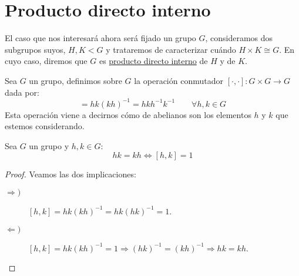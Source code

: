 \section{Producto directo interno}
El caso que nos interesará ahora será fijado un grupo $G$, consideramos dos subgrupos suyos, $H,K<G$ y trataremos de caracterizar cuándo $H\times K \cong G$. En cuyo caso, diremos que $G$ es \underline{producto directo interno} de $H$ y de $K$.

\begin{definicion}[Conmutador]
    Sea $G$ un grupo, definimos sobre $G$ la operación conmutador $[\cdot ,\cdot ]:G\times G \to G$ dada por:
    \begin{equation*}
        [h,k] = hk{(kh)}^{-1} = hkh^{-1}k^{-1}  \qquad \forall h,k\in G
    \end{equation*}
    Esta operación viene a decirnos cómo de abelianos son los elementos $h$ y $k$ que estemos considerando.
\end{definicion}

\begin{prop}\label{prop:primer_conmutador}
    Sea $G$ un grupo y $h,k\in G$:
    \begin{equation*}
        hk = kh \Longleftrightarrow [h,k] = 1
    \end{equation*}
    \begin{proof}
        Veamos las dos implicaciones:
        \begin{description}
            \item [$\Longrightarrow)$] $[h,k] = hk{(kh)}^{-1} = hk{(hk)}^{-1} = 1$.
            \item [$\Longleftarrow)$] $[h,k] = hk{(kh)}^{-1} = 1 \Longrightarrow {(hk)}^{-1} = {(kh)}^{-1} \Longrightarrow hk = kh$.
        \end{description}
    \end{proof}
\end{prop}

